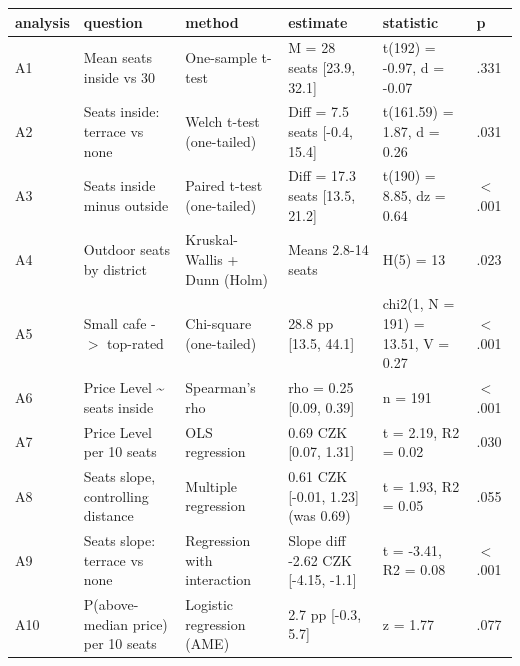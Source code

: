 \begin{tabular}{llllll}
  \toprule
analysis & question & method & estimate & statistic & p \\ 
  \midrule
A1 & Mean seats inside vs 30 & One-sample t-test & M = 28 seats [23.9, 32.1] & t(192) = -0.97, d = -0.07 & .331 \\ 
  A2 & Seats inside: terrace vs none & Welch t-test (one-tailed) & Diff = 7.5 seats [-0.4, 15.4] & t(161.59) = 1.87, d = 0.26 & .031 \\ 
  A3 & Seats inside minus outside & Paired t-test (one-tailed) & Diff = 17.3 seats [13.5, 21.2] & t(190) = 8.85, dz = 0.64 & $<$ .001 \\ 
  A4 & Outdoor seats by district & Kruskal-Wallis + Dunn (Holm) & Means 2.8-14 seats & H(5) = 13 & .023 \\ 
  A5 & Small cafe -$>$ top-rated & Chi-square (one-tailed) & 28.8 pp [13.5, 44.1] & chi2(1, N = 191) = 13.51, V = 0.27 & $<$ .001 \\ 
  A6 & Price Level \~{} seats inside & Spearman's rho & rho = 0.25 [0.09, 0.39] & n = 191 & $<$ .001 \\ 
  A7 & Price Level per 10 seats & OLS regression & 0.69 CZK [0.07, 1.31] & t = 2.19, R2 = 0.02 & .030 \\ 
  A8 & Seats slope, controlling distance & Multiple regression & 0.61 CZK [-0.01, 1.23] (was 0.69) & t = 1.93, R2 = 0.05 & .055 \\ 
  A9 & Seats slope: terrace vs none & Regression with interaction & Slope diff -2.62 CZK [-4.15, -1.1] & t = -3.41, R2 = 0.08 & $<$ .001 \\ 
  A10 & P(above-median price) per 10 seats & Logistic regression (AME) & 2.7 pp [-0.3, 5.7] & z = 1.77 & .077 \\ 
   \bottomrule
\end{tabular}
